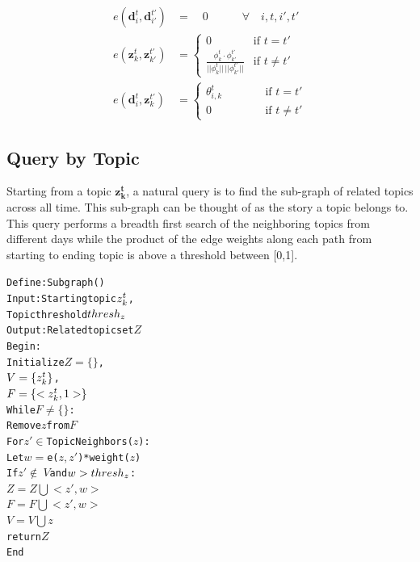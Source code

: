 \documentclass[10pt,twocolumn]{article}
\begin{document}
\begin{align*}
  e(\mathbf{d}_i^t, \mathbf{d}_{i'}^{t'}) &= \quad 0 \qquad\quad \forall \quad i, t, i', t'\\
  e(\mathbf{z}_k^t, \mathbf{z}_{k'}^{t'}) &= \begin{cases}
      0 & \text{if $t=t'$} \\
      \frac{\phi_k^t \cdot \phi_{k'}^{t'}}{||\phi_k^t||\,||\phi_{k'}^{t'}||} & \text{if $t \ne t'$}
    \end{cases} \\
  e(\mathbf{d}_i^t, \mathbf{z}_{k}^{t'}) &= \begin{cases}
      \theta_{i,k}^t & \qquad\quad \text{if $t =t'$} \\
      0 & \qquad\quad \text{if $t \ne t'$}
    \end{cases}
\end{align*}

\subsection {Query by Topic}

Starting from a topic $\mathbf{z_k^t}$, a natural query is to find the sub-graph of related topics across all time.  This sub-graph can be thought of as the story a topic belongs to.  This query performs a breadth first search of the neighboring topics from different days while the product of the edge weights along each path from starting to ending topic is above a threshold between [0,1].   

\begin{framed}
\begin{center}
\begin{alltt}
Define: Subgraph()
Input:  Starting topic \(z\sb{k}\sp{t}\), 
        Topic threshold \(thresh\sb{z}\)
Output: Related topic set \(Z\)
Begin:
  Initialize \(Z = \{\}\),             
             \(V = \{z\sb{k}\sp{t}\}\),
             \(F = \{<z\sb{k}\sp{t}, 1>\}\)
  While \(F \ne \{\}\):
     Remove \(z\) from \(F\)
     For \(z' \in\) TopicNeighbors(\(z\)):
       Let \(w = \)e(\(z, z'\))*weight(\(z\))
       If \(z' \not\in\ V\) and \(w >thresh\sb{z}\):
         \(Z = Z \bigcup <z', w>\)
         \(F = F \bigcup <z', w> \)
     \(V = V \bigcup z\)
  return \(Z\)
End
\end{alltt}
\end{center}
\end{framed}
\end{document}
